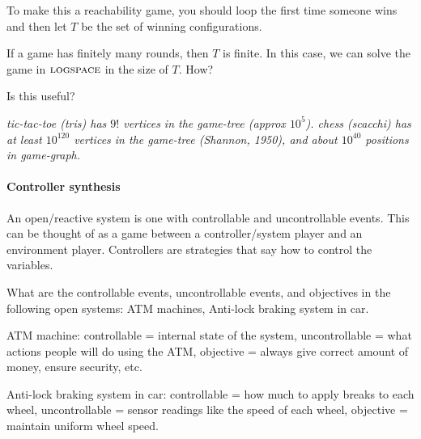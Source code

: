 \documentclass[a4paper,10pt]{article}
\newcommand{\pz}{Player $0$\xspace}
\begin{document}
To make this a reachability game, you should loop the first time someone wins and then let $T$ be the set of winning configurations.

If a game has finitely many rounds, then $T$ is finite. In this case, 
we can solve the game in $\textsc{logspace}$ in the size of $T$. How?

Is this useful?


\it 
\- tic-tac-toe (\emph{tris}) has $9!$ vertices in the game-tree (approx $10^5$).
\- chess (\emph{scacchi}) has at least $10^{120}$ vertices in the game-tree (Shannon, 1950), and about $10^{40}$ positions in game-graph.
\ti




\paragraph{Controller synthesis}
An open/reactive system is one with controllable and uncontrollable events. This can be thought of as a game between a controller/system player 
and an environment player. Controllers are strategies that say how to control the variables.

\begin{question}
 What are the controllable events,  uncontrollable events, and objectives in the following open systems: ATM machines, Anti-lock braking system in car.
\end{question}

 \en
 \- ATM machine: controllable = internal state of the system, uncontrollable = what actions people will do using the ATM, objective = always give correct amount of money, ensure security, etc.

 \- Anti-lock braking system in car: controllable = how much to apply breaks to each wheel, uncontrollable = 
sensor readings like the speed of each wheel, objective = maintain uniform wheel speed.
 \ne
\end{document}
